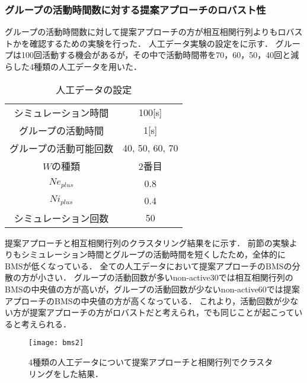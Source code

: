 \subsubsection{グループの活動時間数に対する提案アプローチのロバスト性}
グループの活動時間数に対して提案アプローチの方が相互相関行列よりもロバストかを確認するための実験を行った．
人工データ実験の設定をに示す．
グループは100回活動する機会があるが，その中で活動時間帯を70，60，50，40回と減らした4種類の人工データを用いた．
\begin{table}[htb]
  \center
  \begin{tabular}{c|c} \hline
		シミュレーション時間 & 100[s]\\
		グループの活動時間 & 1[s] \\
		グループの活動可能回数 & 40, 50, 60, 70 \\
		$W$の種類 & 2番目 \\
		$Ne_{plus}$ & 0.8 \\
		$Ni_{plus}$ & 0.4\\
		シミュレーション回数 & 50\\ \hline
  \end{tabular}
  \caption{人工データの設定}
  \label{tab:exp3param1}
\end{table}

提案アプローチと相互相関行列のクラスタリング結果をに示す．
前節の実験よりもシミュレーション時間とグループの活動時間を短くしたため，全体的にBMSが低くなっている．
全ての人工データにおいて提案アプローチのBMSの分散の方が小さい．
グループの活動回数が多いnon-active30では相互相関行列のBMSの中央値の方が高いが，グループの活動回数が少ないnon-active60では提案アプローチのBMSの中央値の方が高くなっている．
これより，活動回数が少ない方が提案アプローチの方がロバストだと考えられ，でも同じことが起こっていると考えられる．
\begin{figure}[htbp]
    \begin{center}
        \texttt{[image: bms2]}
        \caption{4種類の人工データについて提案アプローチと相関行列でクラスタリングをした結果．}
        \label{fig:bms2}
    \end{center}
\end{figure}

